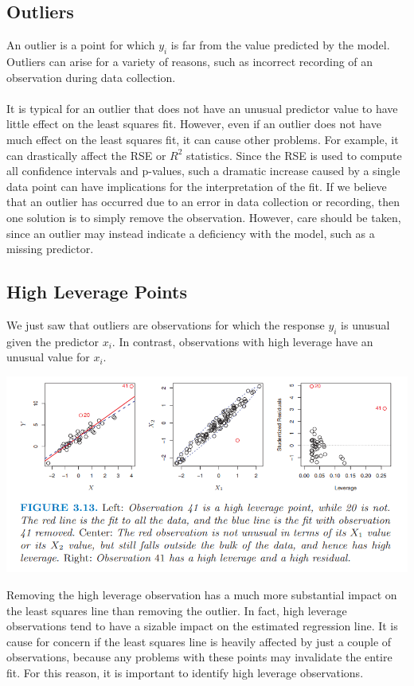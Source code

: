 \subsection{Outliers}
An outlier is a point for which $y_i$ is far from the value predicted by the model. Outliers can arise for a variety of reasons, such as incorrect recording of an observation during data collection.\\\\
 It is typical for an outlier that does not have an unusual
predictor value to have little effect on the least squares fit. However, even if an outlier does not have much effect on the least squares fit, it can cause other problems. For example, it can drastically affect the RSE or $R^2$ statistics. Since the RSE is used to compute all confidence intervals and p-values, such a dramatic increase caused by a single data point can have implications for the interpretation of the fit. If we believe that an outlier has occurred due to an error in data collection or recording, then one solution is to simply remove the observation. However, care should be taken, since an outlier may instead indicate a deficiency with the model, such as a missing predictor.

\subsection{High Leverage Points}
We just saw that outliers are observations for which the response $y_i$ is unusual given the predictor $x_i$. In contrast, observations with high leverage have an unusual value for $x_i$.
\begin{center}
    \includegraphics[scale=0.8]{images/high-laverage.png}
\end{center}
Removing the high leverage observation has a much more substantial impact on the least squares line than removing the outlier. In fact, high leverage observations tend to have a sizable impact on the estimated regression line. It is cause for concern if the least squares line is heavily affected by just a couple of observations,
because any problems with these points may invalidate the entire fit. For this reason, it is important to identify high leverage observations.

